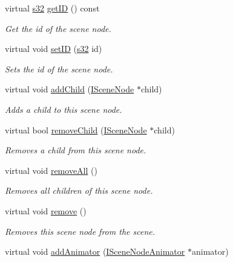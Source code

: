 \begin{DoxyCompactItemize}
virtual \hyperlink{namespaceirr_ac66849b7a6ed16e30ebede579f9b47c6}{s32} \hyperlink{classirr_1_1scene_1_1ISceneNode_a1a3b5b32f54bc1b6617756fc48a2cb17}{get\+ID} () const
\begin{DoxyCompactList}\small\item\em Get the id of the scene node. \end{DoxyCompactList}\item 
virtual void \hyperlink{classirr_1_1scene_1_1ISceneNode_ade60c630c4768200b1d15debbd00fe0e}{set\+ID} (\hyperlink{namespaceirr_ac66849b7a6ed16e30ebede579f9b47c6}{s32} id)
\begin{DoxyCompactList}\small\item\em Sets the id of the scene node. \end{DoxyCompactList}\item 
virtual void \hyperlink{classirr_1_1scene_1_1ISceneNode_acceef4fbb68f6cc7bb40035225350970}{add\+Child} (\hyperlink{classirr_1_1scene_1_1ISceneNode}{I\+Scene\+Node} $\ast$child)
\begin{DoxyCompactList}\small\item\em Adds a child to this scene node. \end{DoxyCompactList}\item 
virtual bool \hyperlink{classirr_1_1scene_1_1ISceneNode_a831e371142fc883c7dd229552e0340de}{remove\+Child} (\hyperlink{classirr_1_1scene_1_1ISceneNode}{I\+Scene\+Node} $\ast$child)
\begin{DoxyCompactList}\small\item\em Removes a child from this scene node. \end{DoxyCompactList}\item 
virtual void \hyperlink{classirr_1_1scene_1_1ISceneNode_a348767bb5b9262d997067c50e079e5be}{remove\+All} ()
\begin{DoxyCompactList}\small\item\em Removes all children of this scene node. \end{DoxyCompactList}\item 
virtual void \hyperlink{classirr_1_1scene_1_1ISceneNode_a2efa2670e29d6bb33b0dd99403b8b69c}{remove} ()
\begin{DoxyCompactList}\small\item\em Removes this scene node from the scene. \end{DoxyCompactList}\item 
virtual void \hyperlink{classirr_1_1scene_1_1ISceneNode_a0e5cd342cd7293c136e53e2c2c5e0f3a}{add\+Animator} (\hyperlink{classirr_1_1scene_1_1ISceneNodeAnimator}{I\+Scene\+Node\+Animator} $\ast$animator)

\end{DoxyCompactItemize}
